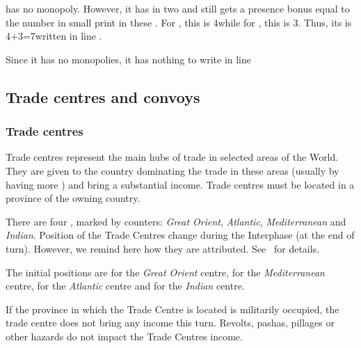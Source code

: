 \begin{exemple}
  \POR has no monopoly. However, it has \TradeFLEET in two \STZ and
  still gets a presence bonus equal to the number in small print in
  these \STZ. For , this is 4\ducats while for
  , this is 3\ducats. Thus, its  is 4+3=7\ducats written in line .

  Since it has no monopolies, it has nothing to write in line
\end{exemple}

\subsection{Trade centres and convoys}
\subsubsection{Trade centres}
\aparag Trade centres represent the main hubs of trade in selected areas
of the World. They are given to the country dominating the trade in
these areas (usually by having more \TradeFLEET) and bring a substantial
income. Trade centres must be located in a province of the owning
country.

\aparag There are four , marked by counters:
\emph{Great Orient}, \emph{Atlantic}, \emph{Mediterranean} and
\emph{Indian}.
\bparag Position of the Trade Centres change during the Interphase (at
the end of turn). However, we remind here how they are attributed.
See~ for details.

\aparag The initial positions are \provinceNil for the \emph{Great
  Orient} centre, \provinceVeneto for the \emph{Mediterranean} centre,
\provinceVlaandern for the \emph{Atlantic} centre and \villeDiu for
the \emph{Indian} centre.

\aparag If the province in which the Trade Centre is located is
militarily occupied, the trade centre does not bring any income this
turn.
\bparag Revolts, pashas, pillages or other hazards do not impact the
Trade Centres income.

